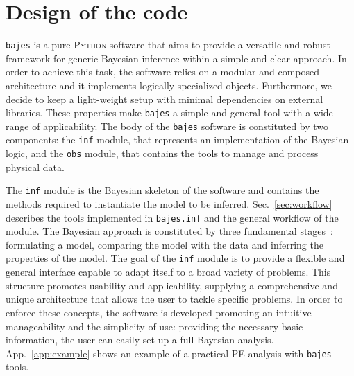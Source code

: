 \documentclass[prd,aps,twocolumn,a4paper,showkeys,nofootinbib,floatfix]{revtex4-1}
\newcommand{\bajes}{{\tt bajes}}
\newcommand{\py}{\textsc{Python}}
\begin{document}
\section{Design of the code} 
\label{sec:design}

{\bajes} is a pure {\py} software that aims to provide a versatile and robust framework 
for generic Bayesian inference 
within a simple and clear approach.  
In order to achieve this task, 
the software relies on a modular and composed 
architecture and it implements logically specialized objects.
Furthermore, we decide to keep a light-weight setup
with minimal
  dependencies on external libraries.
These properties make {\bajes} a simple and general tool with a wide range of applicability.
The body of the {\bajes} software is constituted by two components:
the {\tt inf} module, that represents an implementation of the Bayesian logic,
and the {\tt obs} module, that contains the tools to manage and process 
physical data. 

The {\tt inf} module is the Bayesian skeleton of the software
and contains the methods required to instantiate the model to be inferred.
Sec.~\ref{sec:workflow} describes the tools implemented in {\tt bajes.inf} 
and the general workflow of the module.
The Bayesian approach is 
constituted by three fundamental stages~\cite{gelman2008}: 
formulating a model, 
comparing the model with the data 
and inferring the properties of the model.
The goal of the {\tt inf} module is to provide a 
flexible and general interface capable to adapt itself to a broad variety of problems.
This structure promotes usability and applicability, 
supplying a comprehensive and unique architecture
that allows the user to tackle specific problems.
In order to enforce these concepts, 
the software is developed promoting an intuitive manageability 
and the simplicity of use:
providing the necessary basic information, the user can easily set up a full 
Bayesian analysis. 
App.~\ref{app:example} shows an example of a practical
PE analysis with {\tt bajes} tools.
\end{document}
